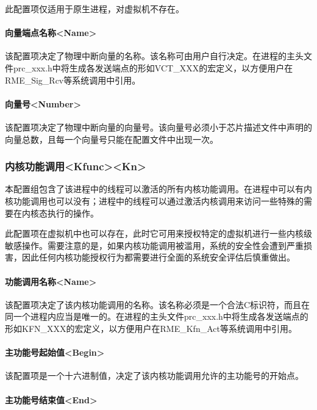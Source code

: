此配置项仅适用于原生进程，对虚拟机不存在。

\paragraph{向量端点名称<Name>{}}\label{par:5-3-14-21-1}

该配置项决定了物理中断向量的名称。该名称可由用户自行决定。在进程的主头文件prc\_xxx.h中将生成各发送端点的形如VCT\_XXX的宏定义，以方便用户在RME\_Sig\_Rcv等系统调用中引用。

\paragraph{向量号<Number>{}}\label{par:5-3-14-21-2}

该配置项决定了物理中断向量的向量号。该向量号必须小于芯片描述文件中声明的向量总数，且每一个向量号只能在配置文件中出现一次。

\subsubsection{内核功能调用<Kfunc><Kn>{}}\label{subsubsec:5-3-14-22}

本配置组包含了该进程中的线程可以激活的所有内核功能调用。在进程中可以有内核功能调用也可以没有；进程中的线程可以通过激活内核调用来访问一些特殊的需要在内核态执行的操作。

此配置项在虚拟机中也可以存在，此时它可用来授权特定的虚拟机进行一些内核级敏感操作。需要注意的是，如果内核功能调用被滥用，系统的安全性会遭到严重损害，因此任何内核功能授权行为都需要进行全面的系统安全评估后慎重做出。

\paragraph{功能调用名称<Name>{}}\label{par:5-3-14-22-1}

该配置项决定了该内核功能调用的名称。该名称必须是一个合法C标识符，而且在同一个进程内应当是唯一的。在进程的主头文件prc\_xxx.h中将生成各发送端点的形如KFN\_XXX的宏定义，以方便用户在RME\_Kfn\_Act等系统调用中引用。

\paragraph{主功能号起始值<Begin>{}}\label{par:5-3-14-22-2}

该配置项是一个十六进制值，决定了该内核功能调用允许的主功能号的开始点。

\paragraph{主功能号结束值<End>{}}\label{par:5-3-14-22-3}

